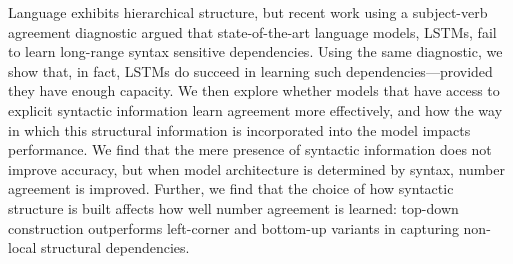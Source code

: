 Language exhibits hierarchical structure, but recent work using a subject-verb agreement diagnostic argued that state-of-the-art language models, LSTMs, fail to learn long-range syntax sensitive dependencies. Using the same diagnostic, we show that, in fact, LSTMs do succeed in learning such dependencies—provided they have enough capacity. We then explore whether models that have access to explicit syntactic information learn agreement more effectively, and how the way in which this structural information is incorporated into the model impacts performance. We find that the mere presence of syntactic information does not improve accuracy, but when model architecture is determined by syntax, number agreement is improved. Further, we find that the choice of how syntactic structure is built affects how well number agreement is learned: top-down construction outperforms left-corner and bottom-up variants in capturing non-local structural dependencies.
